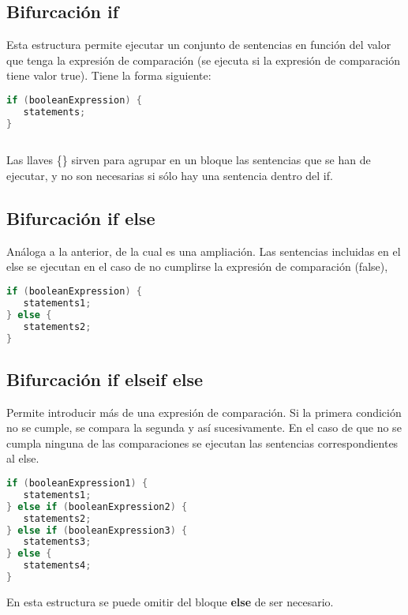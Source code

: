 \subsection{Bifurcación if}
Esta estructura permite ejecutar un conjunto de sentencias en función del valor que tenga la
expresión de comparación (se ejecuta si la expresión de comparación tiene valor true). Tiene la
forma siguiente:

\begin{lstlisting}[language=C++]
if (booleanExpression) {
   statements;
}
	
\end{lstlisting}

Las llaves \{\} sirven para agrupar en un bloque las sentencias que se han de ejecutar, y no son
necesarias si sólo hay una sentencia dentro del if.

\subsection{Bifurcación if else}

Análoga a la anterior, de la cual es una ampliación. Las sentencias incluidas en el else se ejecutan en
el caso de no cumplirse la expresión de comparación (false),

\begin{lstlisting}[language=C++]
if (booleanExpression) {
   statements1;
} else {
   statements2;
}	
\end{lstlisting}

\subsection{Bifurcación if elseif else}

Permite introducir más de una expresión de comparación. Si la primera condición no se cumple, se
compara la segunda y así sucesivamente. En el caso de que no se cumpla ninguna de las
comparaciones se ejecutan las sentencias correspondientes al else.

\begin{lstlisting}[language=C++]
if (booleanExpression1) {
   statements1;
} else if (booleanExpression2) {
   statements2;
} else if (booleanExpression3) {
   statements3;
} else {
   statements4;
}	
\end{lstlisting}

En esta estructura se puede omitir del bloque \textbf{else} de ser necesario. 